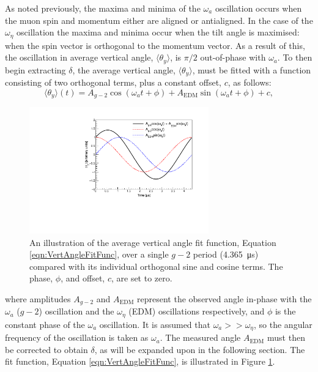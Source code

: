 As noted previously, the maxima and minima of the $\omega_{a}$ oscillation occurs when the muon spin and momentum either are aligned or antialigned. In the case of the $\omega_{\eta}$ oscillation the maxima and minima occur when the tilt angle is maximised: when the spin vector is orthogonal to the momentum vector. As a result of this, the oscillation in average vertical angle, $\langle \theta_{y} \rangle$, is $\pi/2$ out-of-phase with $\omega_{a}$. To then begin extracting $\delta$, the average vertical angle, $\langle\theta_{y}\rangle$, must be fitted with a function consisting of two orthogonal terms, plus a constant offset, $c$, as follows:
%
\begin{equation}
  \langle\theta_{y}\rangle(t)=A_{g-2}\cos(\omega_{a}t+\phi)+A_{\text{EDM}}\sin(\omega_{a}t+\phi) + c,   
  \label{eqn:VertAngleFitFunc}
\end{equation}
%
\begin{figure}[t!]
\centering{}
\includegraphics[trim={0 0 0 0},clip,width=0.69\textwidth]{Images/Chapter2/OrthogonalTermsIllustration.pdf}
\caption{An illustration of the average vertical angle fit function, Equation \ref{eqn:VertAngleFitFunc}, over a single $g-2$ period (\SI{4.365}{\micro\second}) compared with its individual orthogonal sine and cosine terms. The phase, $\phi$, and offset, $c$, are set to zero.}
\label{fig:OrthogonalTermsIllustration}
\end{figure}
%
where amplitudes $A_{g-2}$ and $A_{\text{EDM}}$ represent the observed angle in-phase with the $\omega_{a}$ ($g-2$) oscillation and the $\omega_{\eta}$ (EDM) oscillations respectively, and $\phi$ is the constant phase of the $\omega_{a}$ oscillation. It is assumed that $\omega_{a}>>\omega_{\eta}$, so the angular frequency of the oscillation is taken as $\omega_{a}$. The measured angle $A_{\text{EDM}}$ must then be corrected to obtain $\delta$, as will be expanded upon in the following section. The fit function, Equation \ref{eqn:VertAngleFitFunc}, is illustrated in Figure \ref{fig:OrthogonalTermsIllustration}.



